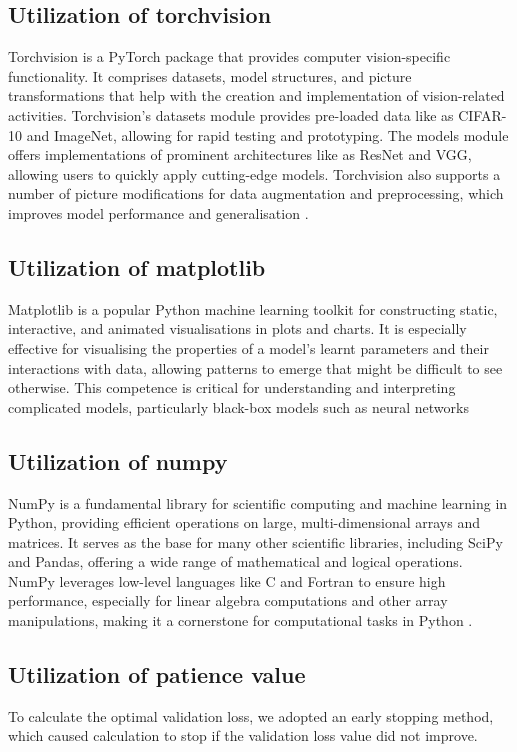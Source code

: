 \documentclass[conference]{IEEEtran}
\begin{document}
\subsection{Utilization of torchvision}
Torchvision is a PyTorch package that provides computer vision-specific functionality. It comprises datasets, model structures, and picture transformations that help with the creation and implementation of vision-related activities. Torchvision's datasets module provides pre-loaded data like as CIFAR-10 and ImageNet, allowing for rapid testing and prototyping. The models module offers implementations of prominent architectures like as ResNet and VGG, allowing users to quickly apply cutting-edge models. Torchvision also supports a number of picture modifications for data augmentation and preprocessing, which improves model performance and generalisation \cite{b9}.

\subsection{Utilization of matplotlib}
Matplotlib is a popular Python machine learning toolkit for constructing static, interactive, and animated visualisations in plots and charts. It is especially effective for visualising the properties of a model's learnt parameters and their interactions with data, allowing patterns to emerge that might be difficult to see otherwise. This competence is critical for understanding and interpreting complicated models, particularly black-box models such as neural networks \cite{b9}

\subsection{Utilization of numpy}
NumPy is a fundamental library for scientific computing and machine learning in Python, providing efficient operations on large, multi-dimensional arrays and matrices. It serves as the base for many other scientific libraries, including SciPy and Pandas, offering a wide range of mathematical and logical operations. NumPy leverages low-level languages like C and Fortran to ensure high performance, especially for linear algebra computations and other array manipulations, making it a cornerstone for computational tasks in Python \cite{b9}.

\subsection{Utilization of patience value}
To calculate the optimal validation loss, we adopted an early stopping method, which caused calculation to stop if the validation loss value did not
improve.
\end{document}
